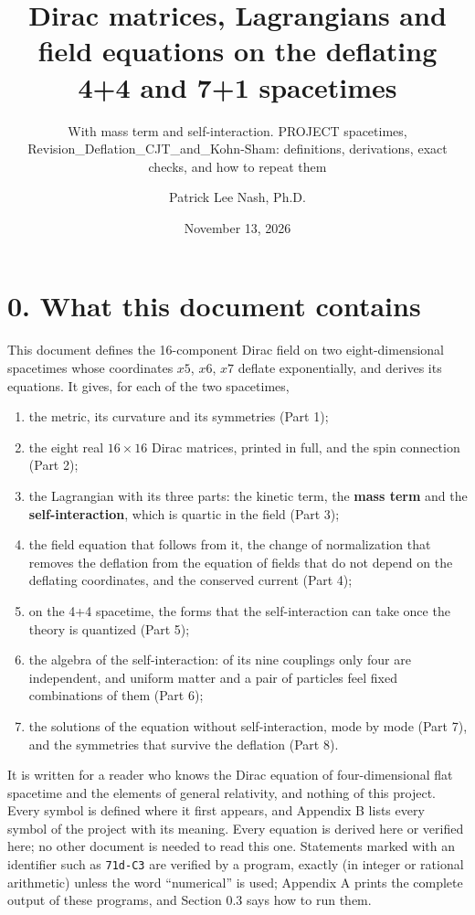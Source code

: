 \documentclass[
  10pt,
]{article}
\title{Dirac matrices, Lagrangians and field equations on the deflating
4+4 and 7+1 spacetimes}
\subtitle{With mass term and self-interaction. PROJECT spacetimes,
Revision\_Deflation\_CJT\_and\_Kohn-Sham: definitions, derivations,
exact checks, and how to repeat them}
\author{Patrick Lee Nash, Ph.D.}
\date{November 13, 2026}
\providecommand{\tightlist}{%
  \setlength{\itemsep}{0pt}\setlength{\parskip}{0pt}}
\begin{document}
\maketitle

\hypertarget{what-this-document-contains}{%
\section{0. What this document
contains}\label{what-this-document-contains}}

This document defines the 16-component Dirac field on two
eight-dimensional spacetimes whose coordinates \(x5\), \(x6\), \(x7\)
deflate exponentially, and derives its equations. It gives, for each of
the two spacetimes,

\begin{enumerate}
\def\labelenumi{\arabic{enumi}.}
\tightlist
\item
  the metric, its curvature and its symmetries (Part 1);
\item
  the eight real \(16\times16\) Dirac matrices, printed in full, and the
  spin connection (Part 2);
\item
  the Lagrangian with its three parts: the kinetic term, the
  \textbf{mass term} and the \textbf{self-interaction}, which is quartic
  in the field (Part 3);
\item
  the field equation that follows from it, the change of normalization
  that removes the deflation from the equation of fields that do not
  depend on the deflating coordinates, and the conserved current (Part
  4);
\item
  on the 4+4 spacetime, the forms that the self-interaction can take
  once the theory is quantized (Part 5);
\item
  the algebra of the self-interaction: of its nine couplings only four
  are independent, and uniform matter and a pair of particles feel fixed
  combinations of them (Part 6);
\item
  the solutions of the equation without self-interaction, mode by mode
  (Part 7), and the symmetries that survive the deflation (Part 8).
\end{enumerate}

It is written for a reader who knows the Dirac equation of
four-dimensional flat spacetime and the elements of general relativity,
and nothing of this project. Every symbol is defined where it first
appears, and Appendix B lists every symbol of the project with its
meaning. Every equation is derived here or verified here; no other
document is needed to read this one. Statements marked with an
identifier such as \texttt{71d-C3} are verified by a program, exactly
(in integer or rational arithmetic) unless the word ``numerical'' is
used; Appendix A prints the complete output of these programs, and
Section 0.3 says how to run them.
\end{document}
